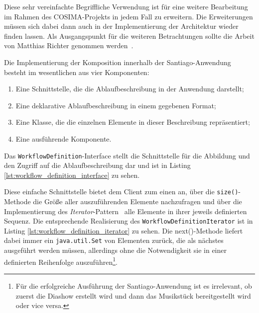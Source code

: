 \begin{center}
{\begin{minipage}[b]{.9\textwidth}
      Diese sehr vereinfachte Begriffliche Verwendung ist für eine weitere Bearbeitung im Rahmen des COSIMA-Projekts in jedem Fall zu erweitern. Die Erweiterungen müssen sich dabei dann auch in der Implementierung der Architektur wieder finden lassen. Als Ausgangspunkt für die weiteren Betrachtungen sollte die Arbeit von Matthias Richter genommen werden~\citep{samma08}.
      
  \end{minipage}
  }
\end{center}

  Die Implementierung der Komposition innerhalb der Santiago-Anwendung besteht im wesentlichen aus vier Komponenten:
  
  \begin{enumerate}
    \item Eine Schnittstelle, die die Ablaufbeschreibung in der Anwendung darstellt;
    \item Eine deklarative Ablaufbeschreibung in einem gegebenen Format;
    \item Eine Klasse, die die einzelnen Elemente in dieser Beschreibung repräsentiert;
    \item Eine ausführende Komponente.
  \end{enumerate}
  
  Das \verb!WorkflowDefinition!-Interface stellt die Schnittstelle für die Abbildung und den Zugriff auf die Ablaufbeschreibung dar und ist in Listing \ref{lst:workflow_definition_interface} zu sehen.



  Diese einfache Schnittstelle bietet dem Client zum einen an, über die \verb!size()!-Methode die Größe aller auszuführenden Elemente nachzufragen und über die Implementierung des \emph{Iterator}-Pattern~\citep[S. 257]{design_patterns} alle Elemente in ihrer jeweils definierten Sequenz. Die entsprechende Realisierung des \verb!WorkflowDefinitionIterator! ist in Listing \ref{lst:workflow_definition_iterator} zu sehen. Die next()-Methode liefert dabei immer ein \verb!java.util.Set! von Elementen zurück, die als nächstes ausgeführt werden müssen, allerdings ohne die Notwendigkeit sie in einer definierten Reihenfolge auszuführen\footnote{Für die erfolgreiche Ausführung der Santiago-Anwendung ist es irrelevant, ob zuerst die Diashow erstellt wird und dann das Musikstück bereitgestellt wird oder vice versa.}.

